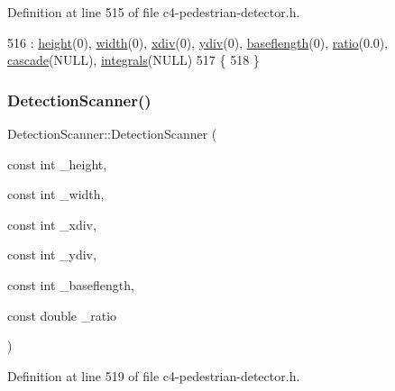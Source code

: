 Definition at line 515 of file c4-\/pedestrian-\/detector.\+h.


\begin{DoxyCode}
516         : \mbox{\hyperlink{class_detection_scanner_a0526f032d5e7efd9fced2592ad5c8d03}{height}}(0), \mbox{\hyperlink{class_detection_scanner_a37d12c13060640ad0321f089cd565476}{width}}(0), \mbox{\hyperlink{class_detection_scanner_ab7083b6ed15a71fa96d623a8f6500613}{xdiv}}(0), \mbox{\hyperlink{class_detection_scanner_a78f38bf8d0990ad9ea8cea03ffe4a189}{ydiv}}(0), \mbox{\hyperlink{class_detection_scanner_aee5791fae7267a2f4a56e429d8842e6e}{baseflength}}(0), 
      \mbox{\hyperlink{class_detection_scanner_a2ac93d1b6aca1959d57133c08b0eaa1c}{ratio}}(0.0), \mbox{\hyperlink{class_detection_scanner_a5fd4ac1b6a6c56a95543eca549c26634}{cascade}}(NULL), \mbox{\hyperlink{class_detection_scanner_a0f64092660cd084b8a1d3b6e8e30cabb}{integrals}}(NULL)
517     \{
518     \}
\end{DoxyCode}
\mbox{\label{class_detection_scanner_a3c06bb2a16b65a6f592536a93d2c2f9e}} 
\subsubsection{\texorpdfstring{Detection\+Scanner()}{DetectionScanner()}\hspace{0.1cm}{\footnotesize\ttfamily [2/2]}}
{\footnotesize\ttfamily Detection\+Scanner\+::\+Detection\+Scanner (\begin{DoxyParamCaption}\item[{const int}]{\+\_\+height,  }\item[{const int}]{\+\_\+width,  }\item[{const int}]{\+\_\+xdiv,  }\item[{const int}]{\+\_\+ydiv,  }\item[{const int}]{\+\_\+baseflength,  }\item[{const double}]{\+\_\+ratio }\end{DoxyParamCaption})\hspace{0.3cm}{\ttfamily [inline]}}



Definition at line 519 of file c4-\/pedestrian-\/detector.\+h.


